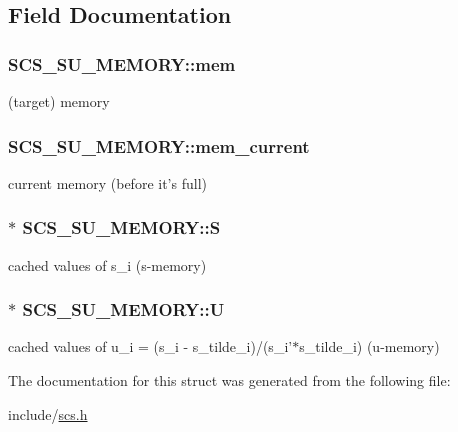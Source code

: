 \subsection{Field Documentation}
\hypertarget{struct_s_c_s___s_u___m_e_m_o_r_y_a2adf52e26eab40e526b88f0576713bad}{
\subsubsection[{mem}]{ S\-C\-S\-\_\-\-S\-U\-\_\-\-M\-E\-M\-O\-R\-Y\-::mem}}\label{struct_s_c_s___s_u___m_e_m_o_r_y_a2adf52e26eab40e526b88f0576713bad}
(target) memory \hypertarget{struct_s_c_s___s_u___m_e_m_o_r_y_a8ff7e7d7b7c9aafbc1b230a62edec9d7}{
\subsubsection[{mem\-\_\-current}]{ S\-C\-S\-\_\-\-S\-U\-\_\-\-M\-E\-M\-O\-R\-Y\-::mem\-\_\-current}}\label{struct_s_c_s___s_u___m_e_m_o_r_y_a8ff7e7d7b7c9aafbc1b230a62edec9d7}
current memory (before it's full) \hypertarget{struct_s_c_s___s_u___m_e_m_o_r_y_aac89225fdd99a98b9e209a434a7fd037}{
\subsubsection[{S}]{$\ast$ S\-C\-S\-\_\-\-S\-U\-\_\-\-M\-E\-M\-O\-R\-Y\-::\-S}}\label{struct_s_c_s___s_u___m_e_m_o_r_y_aac89225fdd99a98b9e209a434a7fd037}
cached values of s\-\_\-i (s-\/memory) \hypertarget{struct_s_c_s___s_u___m_e_m_o_r_y_a2597c54d6bdb9c4950b1c214f5b7f9f3}{
\subsubsection[{U}]{$\ast$ S\-C\-S\-\_\-\-S\-U\-\_\-\-M\-E\-M\-O\-R\-Y\-::\-U}}\label{struct_s_c_s___s_u___m_e_m_o_r_y_a2597c54d6bdb9c4950b1c214f5b7f9f3}
cached values of u\-\_\-i = (s\-\_\-i -\/ s\-\_\-tilde\-\_\-i)/(s\-\_\-i'$\ast$s\-\_\-tilde\-\_\-i) (u-\/memory) 

The documentation for this struct was generated from the following file\-:\begin{DoxyCompactItemize}
\item 
include/\hyperlink{scs_8h}{scs.\-h}\end{DoxyCompactItemize}
